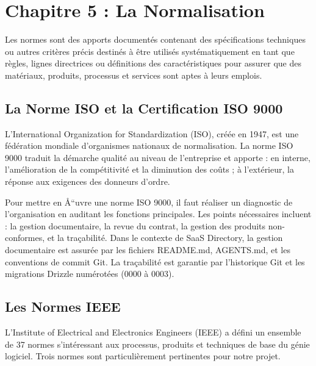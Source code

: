 
\section{Chapitre 5 : La Normalisation}



Les normes sont des apports documentés contenant des spécifications techniques ou autres critères précis destinés à être utilisés systématiquement en tant que règles, lignes directrices ou définitions des caractéristiques pour assurer que des matériaux, produits, processus et services sont aptes à leurs emplois.



\subsection{La Norme ISO et la Certification ISO 9000}



L'International Organization for Standardization (ISO), créée en 1947, est une fédération mondiale d'organismes nationaux de normalisation. La norme ISO 9000 traduit la démarche qualité au niveau de l'entreprise et apporte : en interne, l'amélioration de la compétitivité et la diminution des coûts ; à l'extérieur, la réponse aux exigences des donneurs d'ordre.



Pour mettre en Å“uvre une norme ISO 9000, il faut réaliser un diagnostic de l'organisation en auditant les fonctions principales. Les points nécessaires incluent : la gestion documentaire, la revue du contrat, la gestion des produits non-conformes, et la traçabilité. Dans le contexte de SaaS Directory, la gestion documentaire est assurée par les fichiers README.md, AGENTS.md, et les conventions de commit Git. La traçabilité est garantie par l'historique Git et les migrations Drizzle numérotées (0000 à 0003).



\subsection{Les Normes IEEE}



L'Institute of Electrical and Electronics Engineers (IEEE) a défini un ensemble de 37 normes s'intéressant aux processus, produits et techniques de base du génie logiciel. Trois normes sont particulièrement pertinentes pour notre projet.



